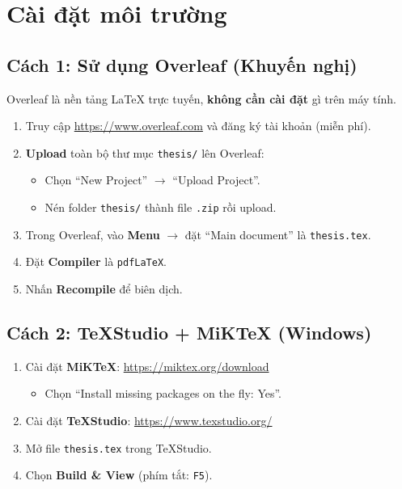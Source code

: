 \section{Cài đặt môi trường}
\label{sec:installation}

\subsection{Cách 1: Sử dụng Overleaf (Khuyến nghị)}

Overleaf là nền tảng \LaTeX{} trực tuyến, \textbf{không cần cài đặt} gì trên máy tính.

\begin{enumerate}
  \item Truy cập \url{https://www.overleaf.com} và đăng ký tài khoản (miễn phí).
  \item \textbf{Upload} toàn bộ thư mục \texttt{thesis/} lên Overleaf:
    \begin{itemize}
      \item Chọn ``New Project'' $\rightarrow$ ``Upload Project''.
      \item Nén folder \texttt{thesis/} thành file \texttt{.zip} rồi upload.
    \end{itemize}
  \item Trong Overleaf, vào \textbf{Menu} $\rightarrow$ đặt ``Main document'' là \texttt{thesis.tex}.
  \item Đặt \textbf{Compiler} là \texttt{pdfLaTeX}.
  \item Nhấn \textbf{Recompile} để biên dịch.
\end{enumerate}

\subsection{Cách 2: TeXStudio + MiKTeX (Windows)}

\begin{enumerate}
  \item Cài đặt \textbf{MiKTeX}: \url{https://miktex.org/download}
    \begin{itemize}
      \item Chọn ``Install missing packages on the fly: Yes''.
    \end{itemize}
  \item Cài đặt \textbf{TeXStudio}: \url{https://www.texstudio.org/}
  \item Mở file \texttt{thesis.tex} trong TeXStudio.
  \item Chọn \textbf{Build \& View} (phím tắt: \texttt{F5}).
\end{enumerate}

